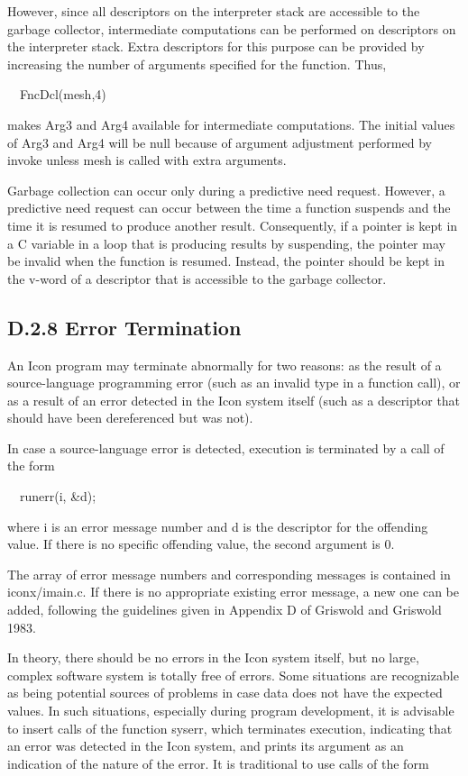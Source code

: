 However, since all descriptors on the interpreter stack are accessible
to the garbage collector, intermediate computations can be performed
on descriptors on the interpreter stack. Extra descriptors for this
purpose can be provided by increasing the number of arguments
specified for the function. Thus,

{\ttfamily\mdseries
\ \ FncDcl(mesh,4)}

\noindent makes Arg3 and Arg4 available for intermediate
computations. The initial values of Arg3 and Arg4 will be null because
of argument adjustment performed by invoke unless mesh is called with
extra arguments.

Garbage collection can occur only during a predictive need
request. However, a predictive need request can occur between the time
a function suspends and the time it is resumed to produce another
result. Consequently, if a pointer is kept in a C variable in a loop
that is producing results by suspending, the pointer may be invalid
when the function is resumed. Instead, the pointer should be kept in
the v-word of a descriptor that is accessible to the garbage
collector.

\subsection{D.2.8 Error Termination}

An Icon program may terminate abnormally for two reasons: as the
result of a source-language programming error (such as an invalid type
in a function call), or as a result of an error detected in the Icon
system itself (such as a descriptor that should have been dereferenced
but was not).

In case a source-language error is detected, execution is terminated
by a call of the form

{\ttfamily\mdseries
\ \ runerr(i, \&d);}

\noindent where i is an error message number and d is the descriptor
for the offending value. If there is no specific offending value, the
second argument is 0.

The array of error message numbers and corresponding messages is
contained in iconx/imain.c. If there is no appropriate existing error
message, a new one can be added, following the guidelines given in
Appendix D of Griswold and Griswold 1983.

In theory, there should be no errors in the Icon system itself, but no
large, complex software system is totally free of errors. Some
situations are recognizable as being potential sources of problems in
case data does not have the expected values. In such situations,
especially during program development, it is advisable to insert calls
of the function syserr, which terminates execution, indicating that an
error was detected in the Icon system, and prints its argument as an
indication of the nature of the error. It is traditional to use calls
of the form

